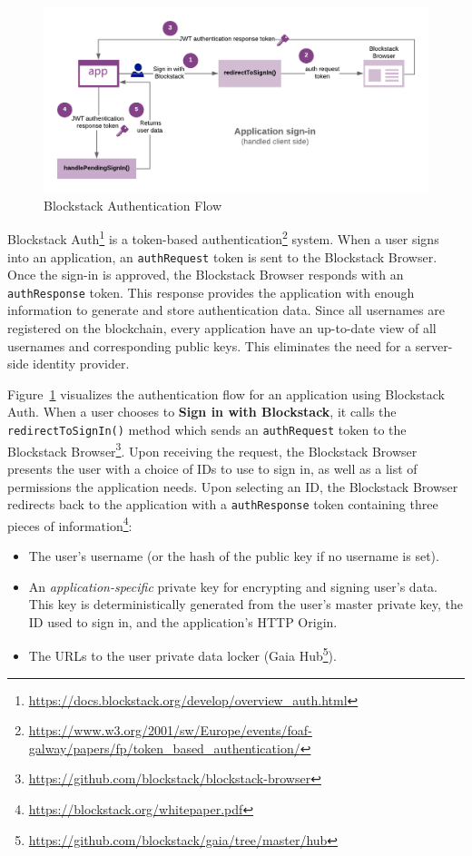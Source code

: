 		\begin{figure}[h]
			\includegraphics[width=\linewidth]{figures/app-sign-in}
			\caption{\label{fig:app-sign-in} Blockstack Authentication Flow\protect\footnotemark}
		\end{figure}
		
		Blockstack Auth\footnote{\url{https://docs.blockstack.org/develop/overview_auth.html}} is a token-based authentication\footnote{\url{https://www.w3.org/2001/sw/Europe/events/foaf-galway/papers/fp/token_based_authentication/}} system. When a user signs into an application, an \texttt{authRequest} token is sent to the Blockstack Browser. Once the sign-in is approved, the Blockstack Browser responds with an \texttt{authResponse} token. This response provides the application with enough information to generate and store authentication data. Since all usernames are registered on the blockchain, every application have an up-to-date view of all usernames and corresponding public keys. This eliminates the need for a server-side identity provider.
	
		Figure~\ref{fig:app-sign-in} visualizes the authentication flow for an application using Blockstack Auth. When a user chooses to \textbf{Sign in with Blockstack}, it calls the \texttt{redirectToSignIn()} method which sends an \texttt{authRequest} token to the Blockstack Browser\footnote{\url{https://github.com/blockstack/blockstack-browser}}. Upon receiving the request, the Blockstack Browser presents the user with a choice of IDs to use to sign in, as well as a list of permissions the application needs. Upon selecting an ID, the Blockstack Browser redirects back to the application with a \texttt{authResponse} token containing three pieces of information\footnote{\url{https://blockstack.org/whitepaper.pdf}}:
		\begin{itemize}
			\item The user's username (or the hash of the public key if no username is set).
			\item An \textit{application-specific} private key for encrypting and signing user's data. This key is deterministically  generated from the user's master private key, the ID used to sign in, and the application's HTTP Origin.
			\item The URLs to the user private data locker (Gaia Hub\footnote{\url{https://github.com/blockstack/gaia/tree/master/hub}}).
		\end{itemize}
		
